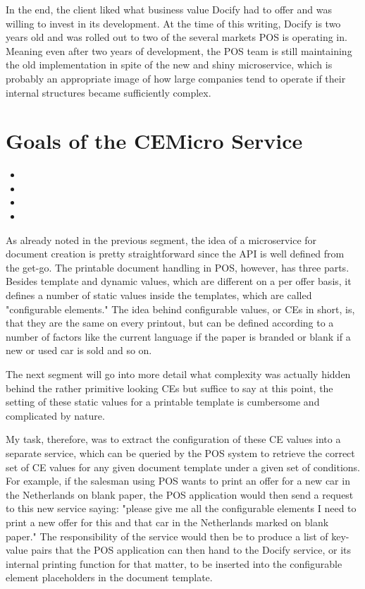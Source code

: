 In the end, the client liked what business value Docify had to offer and was willing to invest in its development. At the time of this writing, Docify is two years old and was rolled out to two of the several markets POS is operating in. Meaning even after two years of development, the POS team is still maintaining the old implementation in spite of the new and shiny microservice, which is probably an appropriate image of how large companies tend to operate if their internal structures became sufficiently complex.


\section{Goals of the CEMicro Service}

\begin{itemize}
  \item {}
  \item {}
  \item {}
  \item {}
\end{itemize}


As already noted in the previous segment, the idea of a microservice for document creation is pretty straightforward since the API is well defined from the get-go. The printable document handling in POS, however, has three parts. Besides template and dynamic values, which are different on a per offer basis, it defines a number of static values inside the templates, which are called "configurable elements." The idea behind configurable values, or CEs in short, is, that they are the same on every printout, but can be defined according to a number of factors like the current language if the paper is branded or blank if a new or used car is sold and so on.

The next segment will go into more detail what complexity was actually hidden behind the rather primitive looking CEs but suffice to say at this point, the setting of these static values for a printable template is cumbersome and complicated by nature.

My task, therefore, was to extract the configuration of these CE values into a separate service, which can be queried by the POS system to retrieve the correct set of CE values for any given document template under a given set of conditions. For example, if the salesman using POS wants to print an offer for a new car in the Netherlands on blank paper, the POS application would then send a request to this new service saying: "please give me all the configurable elements I need to print a new offer for this and that car in the Netherlands marked on blank paper." The responsibility of the service would then be to produce a list of key-value pairs that the POS application can then hand to the Docify service, or its internal printing function for that matter, to be inserted into the configurable element placeholders in the document template.

